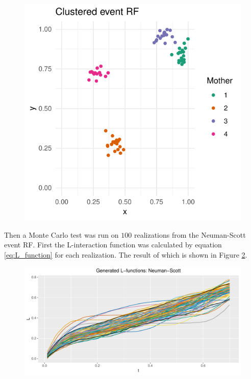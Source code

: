 \begin{figure}
    \centering
    \includegraphics[scale=0.95]{figures/cluster_event_rf.pdf}
    \caption{}
    \label{fig:cluster_event_rf}
\end{figure}
Then a Monte Carlo test was run on $100$ realizations from the Neuman-Scott event RF. First the L-interaction function was calculated by equation \ref{eq:L_function} for each realization. The result of which is shown in Figure \ref{fig:gen_ns_l}.

\begin{figure}
    \centering
    \includegraphics[scale=0.65]{figures/gen_ns_l.pdf}
    \caption{}
    \label{fig:gen_ns_l}
\end{figure}

